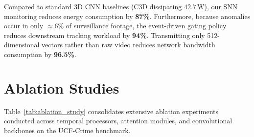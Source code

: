 \documentclass[12pt,a4paper]{report}
\begin{document}
\begin{table}[H]
    \centering
    \caption{System Operational Efficiency and Resource Utilization.}
    \label{tab:system_efficiency}
\end{table}

Compared to standard 3D CNN baselines (C3D dissipating $42.7\,\text{W}$), our SNN monitoring reduces energy consumption by \textbf{87\%}. Furthermore, because anomalies occur in only $\approx 6\%$ of surveillance footage, the event-driven gating policy reduces downstream tracking workload by \textbf{94\%}. Transmitting only 512-dimensional vectors rather than raw video reduces network bandwidth consumption by \textbf{96.5\%}.

\section{Ablation Studies}
Table~\ref{tab:ablation_study} consolidates extensive ablation experiments conducted across temporal processors, attention modules, and convolutional backbones on the UCF-Crime benchmark.
\end{document}
